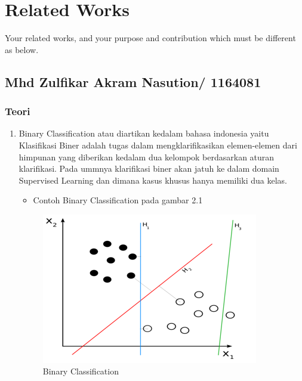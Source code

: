 \chapter{Related Works}

Your related works, and your purpose and contribution which must be different as below.

\section{Mhd Zulfikar Akram Nasution/ 1164081}
\subsection{Teori}
\begin{enumerate}
\item Binary Classification atau diartikan kedalam bahasa indonesia yaitu Klasifikasi Biner adalah tugas dalam mengklarifikasikan elemen-elemen dari himpunan yang diberikan kedalam dua kelompok berdasarkan aturan klarifikasi. Pada ummnya klarifikasi biner akan jatuh ke dalam domain Supervised Learning dan dimana kasus khusus hanya memiliki dua kelas.
\begin{itemize}
\item  Contoh Binary Classification pada gambar 2.1
\end{itemize}
\begin{figure}[ht]
\centering
\includegraphics[scale=0.9]{figures/zulfikar/1.png}
\caption{Binary Classification}
\end{figure}


\end{enumerate}
